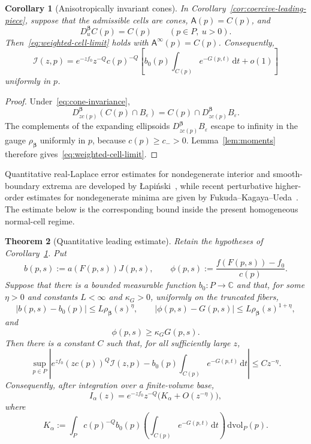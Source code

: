 \documentclass[11pt]{amsart}
\numberwithin{equation}{section}
\newtheorem{theorem}{Theorem}[section]
\newtheorem{corollary}[theorem]{Corollary}
\theoremstyle{definition}
\theoremstyle{remark}
\newcommand{\C}{\mathbb{C}}
\newcommand{\dd}{\,\mathrm{d}}
\newcommand{\dvol}{\,\mathrm{dvol}}
\newcommand{\eps}{\varepsilon}
\newcommand{\cI}{\mathcal{I}}
\newcommand{\Afib}{\mathsf{A}}
\begin{document}
\begin{corollary}[Anisotropically invariant cones]\label{cor:invariant-cones}
In Corollary~\ref{cor:coercive-leading-piece}, suppose that the admissible cells are cones,
$\Afib(p)=C(p)$, and
\begin{equation}\label{eq:cone-invariance}
  D_u^{\bm\beta}C(p)=C(p)
  \qquad(p\in P,\ u>0).
\end{equation}
Then~\eqref{eq:weighted-cell-limit} holds with
$\Afib^\infty(p)=C(p)$.  Consequently,
\begin{equation}\label{eq:invariant-cone-leading}
  \cI(z,p)=e^{-zf_0}z^{-Q}c(p)^{-Q}
  \left[b_0(p)\int_{C(p)}e^{-G(p,t)}\dd t+o(1)\right]
\end{equation}
uniformly in $p$.
\end{corollary}

\begin{proof}
Under~\eqref{eq:cone-invariance},
\[
 D_{zc(p)}^{\bm\beta}(C(p)\cap B_\eps)
 =C(p)\cap D_{zc(p)}^{\bm\beta}B_\eps.
\]
The complements of the expanding ellipsoids
$D_{zc(p)}^{\bm\beta}B_\eps$ escape to infinity in the gauge
$\rho_{\bm\beta}$ uniformly in $p$, because $c(p)\ge c_->0$.
Lemma~\ref{lem:moments} therefore gives~\eqref{eq:weighted-cell-limit}.
\end{proof}

Quantitative real-Laplace error estimates for nondegenerate interior and
smooth-boundary extrema are developed by \L{}api\'nski~\cite{Lapinski}, while
recent perturbative higher-order estimates for nondegenerate minima are given
by Fukuda--Kagaya--Ueda~\cite{FukudaKagayaUeda}.  The estimate below is the
corresponding bound inside the present homogeneous normal-cell regime.

\begin{theorem}[Quantitative leading estimate]\label{thm:quantitative-leading}
Retain the hypotheses of Corollary~\ref{cor:invariant-cones}.  Put
\[
 b(p,s):=a(F(p,s))J(p,s),\qquad
 \phi(p,s):=\frac{f(F(p,s))-f_0}{c(p)}.
\]
Suppose that there is a bounded measurable function $b_0:P\to\C$ and
that, for some $\eta>0$ and constants $L<\infty$ and $\kappa_G>0$, uniformly
on the truncated fibers,
\begin{equation}\label{eq:quantitative-jets}
 |b(p,s)-b_0(p)|\le L\rho_{\bm\beta}(s)^\eta,
 \qquad
 |\phi(p,s)-G(p,s)|\le L\rho_{\bm\beta}(s)^{1+\eta},
\end{equation}
and
\begin{equation}\label{eq:quantitative-lower-bound}
 \phi(p,s)\ge\kappa_G G(p,s).
\end{equation}
Then there is a constant $C$ such that, for all sufficiently large $z$,
\begin{equation}\label{eq:quantitative-leading-result}
 \sup_{p\in P}\left|
 e^{zf_0}(zc(p))^Q\cI(z,p)
 -b_0(p)\int_{C(p)}e^{-G(p,t)}\dd t
 \right|\le Cz^{-\eta}.
\end{equation}
Consequently, after integration over a finite-volume base,
\[
 I_\alpha(z)=e^{-zf_0}z^{-Q}\bigl(K_\alpha+O(z^{-\eta})\bigr),
\]
where
\[
 K_\alpha:=\int_P c(p)^{-Q}b_0(p)
 \left(\int_{C(p)}e^{-G(p,t)}\dd t\right)\dvol_P(p).
\]
\end{theorem}
\end{document}
